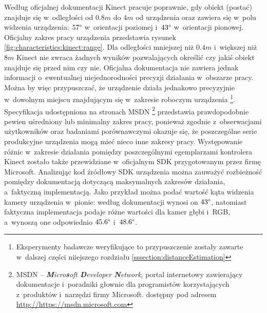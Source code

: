 Według oficjalnej dokumentacji \cite{kinectSpec2016} Kinect pracuje poprawnie, gdy obiekt (postać) znajduje się w~odległości od $0.8m$ do $4m$ od urządzenia oraz zawiera się w~polu widzenia urządzenia: $57\degree$ w~orientacji poziomej i~$43\degree$ w~orientacji pionowej. Oficjalny zakres pracy urządzenia przedstawia rysunek \ref{fig:characteristics:kinect:range}. Dla odległości mniejszej niż $0.4m$ i~większej niż $8m$ Kinect nie zwraca żadnych wyników pozwalających określić czy jakiś obiekt znajduje się przed nim czy nie. Oficjalna dokumentacja nie zawiera jednak informacji o~ewentualnej niejednorodności precyzji działania w~obszarze pracy. Można by więc przypuszczać, że urządzenie działa jednakowo precyzyjnie w~dowolnym miejscu znajdującym się w~zakresie roboczym urządzenia \footnote{Eksperymenty badawcze weryfikujące to przypuszczenie zostały zawarte w~dalszej części niiejszego rozdziału \ref{sssection:distanceEstimation}}. 
Specyfikacja udostępniona na stronach MSDN \footnote{MSDN -- \emph{\textbf{M}icro\textbf{s}oft \textbf{D}eveloper \textbf{N}etwork}, portal internetowy zawierający dokumentacje i~poradniki głownie dla programistów korzystających z~produktów i~narzędzi firmy Microsoft. dostępny pod adresem \url{http://https://msdn.microsoft.com}}
przedstawia prawdopodobnie pewien uśredniony lub minimalny zakres pracy, ponieważ zgodnie z~obserwacjami użytkowników \cite{stack:kinect2011} oraz badaniami porównawczymi \cite{DiFilippo2015} okazuje się, że poszczególne serie produkcyjne urządzenia mogą mieć nieco inne zakresy pracy. Występowanie różnic w~zakresie działania pomiędzy poszczególnymi egemplarzami kontrolera Kinect zostało także przewidziane w~oficjalnym SDK przygotowanym przez firmę Microsoft\cite{msdn:kinectSDKConstants2016}. Analizując kod źródłowy SDK urządzenia można zauważyć rozbieżność pomiędzy dokumentacją dotyczącą maksymalnych zakresów działania, a~faktyczną implementacją. Jako przykład można podać wartość kąta widzenia kamery urządzenia w~pionie: według dokumentacji wynosi on $43\degree$, natomiast faktyczna implementacja podaje różne wartości dla kamer głębi i~RGB, a~wynoszą one odpowiednio $45.6\degree$ i~$48.6\degree$. 
		

		
